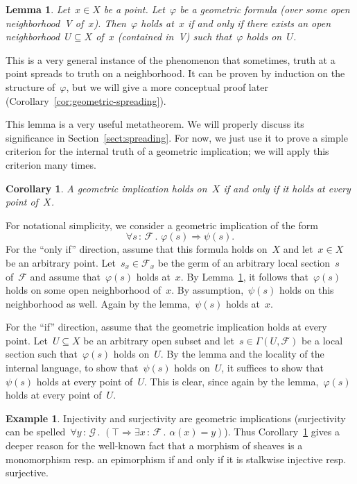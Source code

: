 \documentclass[10pt,reqno,a4paper]{amsbook}
\makeatletter
\theoremstyle{definition}
\newtheorem{ex}[defn]{Example}
\theoremstyle{plain}
\newtheorem{cor}[defn]{Corollary}
\newtheorem{lemma}[defn]{Lemma}
\theoremstyle{remark}
\newcommand{\F}{\mathcal{F}}
\renewcommand{\G}{\mathcal{G}}
\newcommand{\?}{\,{:}\,}
\renewcommand{\_}{\mathpunct{.}\,}
\newcommand{\resp}{resp.\@\xspace}
\renewenvironment{proof}[1][\proofname]{\par
  \pushQED{\qed}%
  \normalfont \topsep6\p@\@plus6\p@\relax
  \trivlist
  \item[\hskip\labelsep
        \itshape
    #1\@addpunct{.}]\ignorespaces
}{%
  \popQED\endtrivlist\@endpefalse
}
\makeatother
\begin{document}
\begin{lemma}\label{lemma:geometric-stalk-neighborhood}
Let~$x \in X$ be a point. Let~$\varphi$ be a geometric formula (over some open
neighborhood~V of~$x$).
Then~$\varphi$ holds at~$x$ if and only if there exists an open neighborhood~$U
\subseteq X$ of~$x$ (contained in~V) such that~$\varphi$ holds on~$U$.
\end{lemma}
\begin{proof}This is a very general instance of the phenomenon that sometimes,
truth at a point spreads to truth on a neighborhood. It can be proven by
induction on the structure of~$\varphi$, but we will give a more conceptual
proof later (Corollary~\ref{cor:geometric-spreading}).
\end{proof}

This lemma is a very useful metatheorem. We will properly discuss its
significance in Section~\ref{sect:spreading}. For now, we just use it to prove a
simple criterion for the internal truth of a geometric implication; we will
apply this criterion many times.

\begin{cor}\label{cor:geometric-implication}
A geometric implication holds on~$X$ if and only if it holds at
every point of~$X$.\end{cor}
\begin{proof}For notational simplicity, we consider a geometric implication of
the form
\[ \forall s\?\F\_ \varphi(s) \Rightarrow \psi(s). \]
For the ``only if'' direction, assume that this formula holds on~$X$ and let~$x
\in X$ be an arbitrary point. Let~$s_x \in \F_x$ be the germ of an arbitrary
local section~$s$ of~$\F$ and assume that~$\varphi(s)$ holds at~$x$. By
Lemma~\ref{lemma:geometric-stalk-neighborhood}, it follows that~$\varphi(s)$ holds on some open neighborhood of~$x$. By
assumption,~$\psi(s)$ holds on this neighborhood as well. Again by the
lemma,~$\psi(s)$ holds at~$x$.

For the ``if'' direction, assume that the geometric implication holds at every
point. Let~$U \subseteq X$ be an arbitrary open subset and let~$s \in
\Gamma(U,\F)$ be a local section such that~$\varphi(s)$ holds on~$U$. By the
lemma and the locality of the internal language, to show that~$\psi(s)$ holds
on~$U$, it suffices to show that~$\psi(s)$
holds at every point of~$U$. This is clear, since again by the
lemma,~$\varphi(s)$ holds at every point of~$U$.
\end{proof}

\begin{ex}Injectivity and surjectivity are geometric implications (surjectivity
can be spelled~$\forall y\?\G\_ (\top \Rightarrow \exists x\?\F\_ \alpha(x) =
y)$). Thus Corollary~\ref{cor:geometric-implication} gives a deeper reason for the well-known fact that a
morphism of sheaves is a monomorphism \resp an epimorphism if and only if it is
stalkwise injective \resp surjective.\end{ex}
\end{document}
